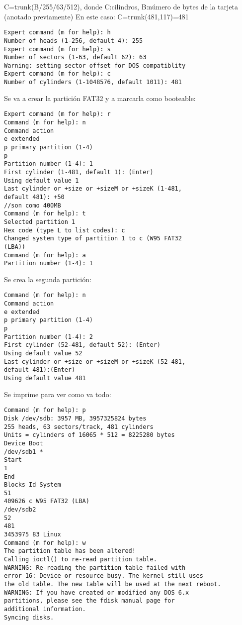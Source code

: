 \bigskip
C=trunk(B/255/63/512), donde C:cilindros, B:número de bytes de la tarjeta (anotado previamente) 
En este caso: C=trunk(481,117)=481 

\begin{verbatim}
Expert command (m for help): h 
Number of heads (1-256, default 4): 255 
Expert command (m for help): s 
Number of sectors (1-63, default 62): 63 
Warning: setting sector offset for DOS compatiblity 
Expert command (m for help): c 
Number of cylinders (1-1048576, default 1011): 481 
\end{verbatim}


Se va a crear la partición FAT32 y a marcarla como booteable: 

\begin{verbatim}
Expert command (m for help): r 
Command (m for help): n 
Command action 
e extended 
p primary partition (1-4) 
p 
Partition number (1-4): 1 
First cylinder (1-481, default 1): (Enter) 
Using default value 1 
Last cylinder or +size or +sizeM or +sizeK (1-481, 
default 481): +50 
//son como 400MB 
Command (m for help): t 
Selected partition 1 
Hex code (type L to list codes): c 
Changed system type of partition 1 to c (W95 FAT32 
(LBA)) 
Command (m for help): a 
Partition number (1-4): 1 
\end{verbatim}

Se crea la segunda partición: 

\begin{verbatim}
Command (m for help): n 
Command action 
e extended 
p primary partition (1-4) 
p 
Partition number (1-4): 2 
First cylinder (52-481, default 52): (Enter) 
Using default value 52 
Last cylinder or +size or +sizeM or +sizeK (52-481, 
default 481):(Enter) 
Using default value 481 
\end{verbatim}

Se imprime para ver como va todo: 

\begin{verbatim}
Command (m for help): p 
Disk /dev/sdb: 3957 MB, 3957325824 bytes 
255 heads, 63 sectors/track, 481 cylinders 
Units = cylinders of 16065 * 512 = 8225280 bytes 
Device Boot 
/dev/sdb1 * 
Start 
1 
End 
Blocks Id System 
51 
409626 c W95 FAT32 (LBA) 
/dev/sdb2 
52 
481 
3453975 83 Linux 
Command (m for help): w 
The partition table has been altered! 
Calling ioctl() to re-read partition table. 
WARNING: Re-reading the partition table failed with 
error 16: Device or resource busy. The kernel still uses 
the old table. The new table will be used at the next reboot. 
WARNING: If you have created or modified any DOS 6.x 
partitions, please see the fdisk manual page for 
additional information. 
Syncing disks. 
\end{verbatim}

